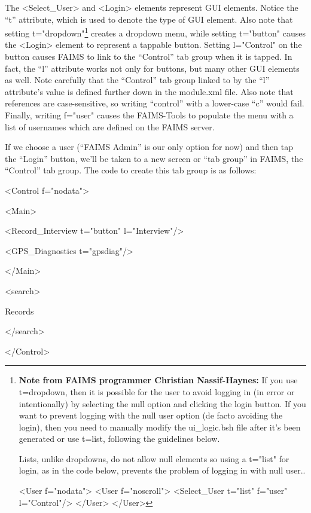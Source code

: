 The <Select_User> and <Login> elements represent GUI elements. Notice the “t” attribute, which is used to denote the type of GUI element. Also note that setting t="dropdown"\footnote{{\bf Note from FAIMS programmer Christian Nassif-Haynes:} If you use t=dropdown, then it is possible for the user to avoid logging in (in error or intentionally) by selecting the null option and clicking the login button. If you want to prevent logging with the null user option (de facto avoiding the login), then you need to manually modify the ui_logic.bsh file after it's been generated or use t=list, following the guidelines below.

  Lists, unlike dropdowns, do not allow null elements so using a t="list" for login, as in the code below, prevents the problem of logging in with null user..

  <User f="nodata">\crlf
  <User f="noscroll">\crlf
  <Select_User t="list" f="user" l="Control"/>\crlf
  </User>\crlf
  </User>} creates a dropdown menu, while setting t="button" causes the <Login> element to represent a tappable button. Setting l="Control" on the button causes FAIMS to link to the “Control” tab group when it is tapped. In fact, the “l” attribute works not only for buttons, but many other GUI elements as well. Note carefully that the “Control” tab group linked to by the “l” attribute's value is defined further down in the module.xml file. Also note that references are case-sensitive, so writing “control” with a lower-case “c” would fail. Finally, writing f="user" causes the FAIMS-Tools to populate the menu with a list of usernames which are defined on the FAIMS server.

{}

If we choose a user (“FAIMS Admin” is our only option for now) and then tap the “Login” button, we'll be taken to a new screen or “tab group” in FAIMS, the “Control” tab group. The code to create this tab group is as follows:

<Control f="nodata">

<Main>

<Record_Interview t="button" l="Interview"/>

<GPS_Diagnostics t="gpsdiag"/>

</Main>

<search>

Records

</search>

</Control>

{}

